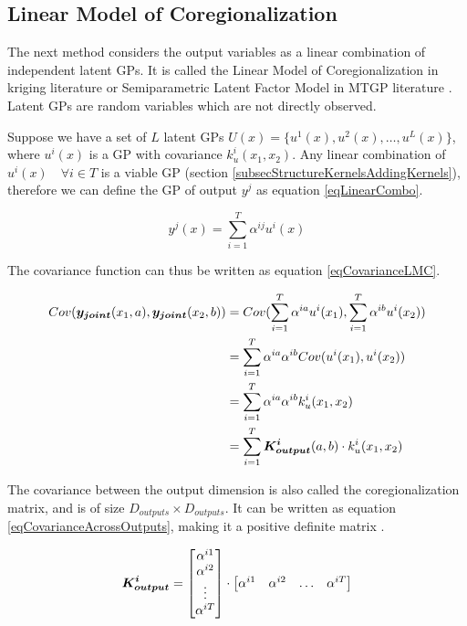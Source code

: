 \subsection{Linear Model of Coregionalization}\label{subsecLMC}
The next method considers the output variables as a linear combination of independent latent GPs. It is called the Linear Model of Coregionalization in kriging literature \cite{goovaerts1997geostatistics} or Semiparametric Latent Factor Model in MTGP literature \cite{seeger2005semiparametric}. Latent GPs are random variables which are not directly observed. 

Suppose we have a set of $L$ latent GPs $U(x) = \{u^{1}(x), u^2(x), \ldots, u^{L}(x)\}$, where $u^{i}(x)$ is a GP with covariance $k_{u}^{i}(x_{1}, x_{2})$. Any linear combination of $u^{i}(x) \quad \forall i \in T$ is a viable GP (section \ref{subsecStructureKernelsAddingKernels}), therefore we can define the GP of output $y^{j}$ as equation \ref{eqLinearCombo}. 

\begin{equation}\label{eqLinearCombo}
y^{j}(x) = \sum_{i=1}^{T} \alpha^{ij}u^{i}(x)
\end{equation}

The covariance function can thus be written as equation \ref{eqCovarianceLMC}.

\begin{equation}\label{eqCovarianceLMC} 
 \begin{aligned}
Cov(\boldsymbol{y_{joint}}(x_{1}, a), \boldsymbol{y_{joint}}(x_{2}, b)) & = Cov(\sum_{i=1}^{T} \alpha^{ia}u^{i}(x_{1}), \sum_{i=1}^{T} \alpha^{ib}u^{i}(x_{2})) \\ 
& = \sum_{i=1}^{T} \alpha^{ia}\alpha^{ib} Cov(u^{i}(x_{1}), u^{i}(x_{2})) \\ 
& = \sum_{i=1}^{T} \alpha^{ia}\alpha^{ib}k_{u}^{i}(x_{1}, x_{2}) \\ 
& = \sum_{i=1}^{T} \boldsymbol{K_{output}^{i}}(a, b) \cdot k_{u}^{i}(x_{1}, x_{2})
 \end{aligned}
\end{equation}

The covariance between the output dimension  is also called the coregionalization matrix, and is of size $D_{outputs} \times D_{outputs}$. It can be written as equation \ref{eqCovarianceAcrossOutputs}, making it a positive definite matrix \cite{mercer1909functions}.

\begin{equation}\label{eqCovarianceAcrossOutputs}
\boldsymbol{K_{output}^{i}} = \begin{bmatrix}
\alpha^{i1}\\ 
\alpha^{i2}\\ 
\vdots\\ 
\alpha^{iT}
\end{bmatrix} \cdot \begin{bmatrix}
\alpha^{i1} & \alpha^{i2} & \ldots & \alpha^{iT}
\end{bmatrix}
\end{equation}

